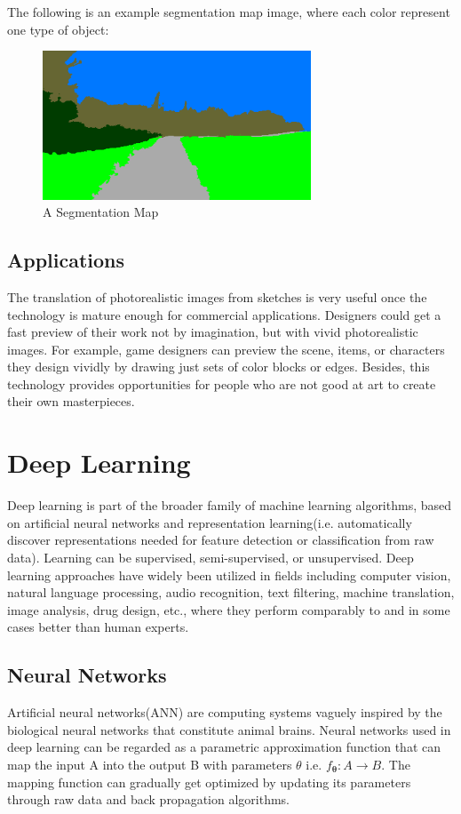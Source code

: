 The following is an example segmentation map image, where each color represent one type of object:
\begin{figure}[H]
    \begin{center}
    \includegraphics[width=8cm]{figures/seg-map-eg}
    \end{center}
    \caption{A Segmentation Map}
    \label{fig:segmentation-map-example}
\end{figure}

\subsection{Applications}
The translation of photorealistic images from sketches is very useful once the technology is 
mature enough for commercial applications. Designers could get a fast preview of 
their work not by imagination, but with vivid photorealistic images. For example, 
game designers can preview the scene, items, or characters they design vividly by drawing 
just sets of color blocks or edges. Besides, this technology provides opportunities for 
people who are not good at art to create their own masterpieces.


\section{Deep Learning}
\nocite{articleDL}
\nocite{Goodfellow-et-al-2016}
Deep learning is part of the broader family of machine learning algorithms, based on
artificial neural networks and representation learning(i.e. automatically discover 
representations needed for feature detection or classification from raw data). Learning
can be supervised, semi-supervised, or unsupervised. Deep learning approaches have widely
been utilized in fields including computer vision, natural language processing, 
audio recognition, text filtering, machine translation, image analysis, drug design, etc., 
where they perform comparably to and in some cases better than human experts.  

\subsection{Neural Networks}
Artificial neural networks(ANN) are computing systems vaguely inspired by 
the biological neural networks that constitute animal brains. Neural networks used in deep learning 
can be regarded as a parametric approximation function that can map the input A into the output
B with parameters $\theta$ i.e. $f_{\boldsymbol{\theta}}: A \rightarrow B$. The mapping 
function can gradually get optimized by updating its parameters through raw data and 
back propagation algorithms. 

